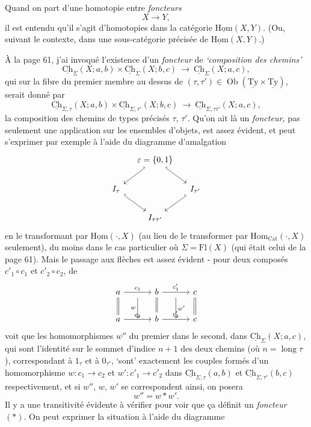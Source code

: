 \documentclass[11pt]{article}
\newcommand{\printedpage}[1]{\marginpar{\footnotesize p.~#1}}
\newcommand{\msp}[1]{\marginpar{\vspace*{10pt}\footnotesize [#1]}}
\newcommand{\Ch}{\underline{\mathrm{Ch}}}
\newcommand{\Ty}{\underline{\mathrm{Ty}}}
\newcommand{\uHom}{\underline{\mathrm{Hom}}}
\begin{document}
Quand on part d'une homotopie entre \textit{foncteurs}
\[
X \longrightarrow Y,
\]
il est entendu qu'il s'agit d'homotopies dans la catégorie $\uHom(X,Y)$. (Ou, suivant le contexte, dans une sous-catégorie précisée de $\uHom(X,Y)$.)

\msp{page 77}
À la page 61, j'ai invoqué l'existence d'un \textit{foncteur} de \textit{`composition des chemins'}
\[
\Ch_{\Sigma}(X;a,b)\times\Ch_{\Sigma}(X;b,c) \ \longrightarrow\ \Ch_{\Sigma}(X;a,c),
\]
qui sur la fibre du premier membre au dessus de $(\tau,\tau') \in \operatorname{Ob}(\Ty\times\Ty)$, serait donné par
\[
\Ch_{\Sigma,\tau}(X;a,b)\times\Ch_{\Sigma,\tau'}(X;b,c) \ \longrightarrow\ \Ch_{\Sigma,\tau\tau'}(X;a,c), \tag*{$(*)$}
\]
la composition des chemins de types précisés $\tau$, $\tau'$. Qu'on ait là un \textit{foncteur,} pas seulement une application sur les ensembles d'objets, est assez évident, et peut s'exprimer par exemple à l'aide du diagramme d'amalgation
\[
\begin{tikzcd}[column sep=small]
 & \varepsilon = \{0,1\} \ar[dl,hook'] \ar[dr,hook] & \\
I_{\tau} \ar[dr,hook] & & I_{\tau'} \ar[dl,hook'] \\
 & I_{\tau\tau'} &
\end{tikzcd}
\]
en le transformant par $\uHom(\cdot,X)$ (au lieu de le transformer par $\mathrm{Hom}_{\mathrm{Cat}}(\cdot,X)$ seulement), du moins dans le cas particulier où $\Sigma = \mathrm{Fl}(X)$ (qui était celui de la page 61). Mais le passage aux flèches est assez évident - pour deux composés $c'_1\circ c_1$ et $c'_2\circ c_2$, de
\[
\begin{tikzcd}[column sep=small]
a \ar[rr,"c_1"] \ar[d,equal] & {} \ar[d,"w"'] & b \ar[rr,"c'_1"] \ar[d,equal] & {} \ar[d,"w'"] & c \ar[d,equal] \\
a \ar[rr,"c_2"] & {} & b \ar[rr,"c'_2"] & {} & c
\end{tikzcd}
\]
 voit que les homomorphismes $w''$ du premier dans le second, dans $\Ch_{\Sigma}(X;a,c)$, qui sont l'identité sur le sommet d'indice $n+1$ des deux chemins (où $n = \operatorname{long}\tau$), correspondant à $1_{\tau}$ et à $0_{\tau'}$, `sont' exactement les couples
\printedpage{51}
\msp{page 78}
formés d'un homomorphisme $w : c_1 \longrightarrow c_2$ et $w' : c'_1 \longrightarrow c'_2$ dans $\Ch_{\Sigma,\tau}(a,b)$ et $\Ch_{\Sigma,\tau'}(b,c)$ respectivement, et si $w''$, $w$, $w'$ se correspondent ainsi, on posera
\[
w'' = w * w'.
\]
Il y a une transitivité évidente à vérifier pour voir que ça définit un \textit{foncteur} $(*)$. On peut exprimer la situation à l'aide du diagramme
\end{document}
